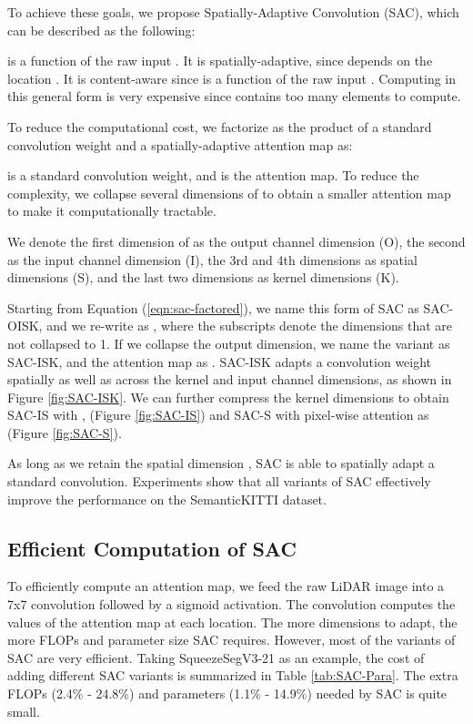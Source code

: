 \documentclass[runningheads]{llncs}
\begin{document}
To achieve these goals, we propose Spatially-Adaptive Convolution (SAC), which can be described as the following:
 
 is a function of the raw input .  It is spatially-adaptive, since  depends on the location . It is content-aware since  is a function of the raw input . Computing  in this general form is very expensive since  contains too many elements to compute.


To reduce the computational cost, we factorize  as the product of a standard convolution weight and a spatially-adaptive attention map as:

 is a standard convolution weight, and  is the attention map. To reduce the complexity, we collapse several dimensions of  to obtain a smaller attention map to make it computationally tractable. 

We denote the first dimension of  as the output channel dimension (O), the second as the input channel dimension (I), the 3rd and 4th dimensions as spatial dimensions (S), and the last two dimensions as kernel dimensions (K). 

Starting from Equation (\ref{eqn:sac-factored}), we name this form of SAC as SAC-OISK, and we re-write  as , where the subscripts denote the dimensions that are not collapsed to 1. If we collapse the output dimension, we name the variant as SAC-ISK, and the attention map as . SAC-ISK adapts a convolution weight spatially as well as across the kernel and input channel dimensions, as shown in Figure \ref{fig:SAC-ISK}. We can further compress the kernel dimensions to obtain SAC-IS with , (Figure \ref{fig:SAC-IS}) and SAC-S with pixel-wise attention as  (Figure \ref{fig:SAC-S}). 



As long as we retain the spatial dimension , SAC is able to spatially adapt a standard convolution. Experiments show that all variants of SAC effectively improve the performance on the SemanticKITTI dataset. 

\subsection{Efficient Computation of SAC}
To efficiently compute an attention map, we feed the raw LiDAR image  into a 7x7 convolution followed by a sigmoid activation. The convolution computes the values of the attention map at each location. The more dimensions to adapt, the more FLOPs and parameter size SAC requires. However, most of the variants of SAC are very efficient. Taking SqueezeSegV3-21 as an example, the cost of adding different SAC variants is summarized in Table \ref{tab:SAC-Para}. The extra FLOPs (2.4\% - 24.8\%) and parameters (1.1\% - 14.9\%) needed by SAC is quite small.
    
\end{document}
